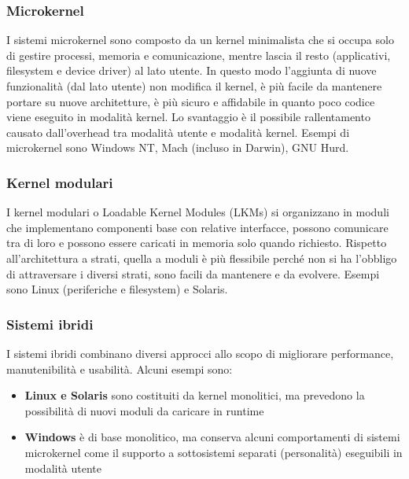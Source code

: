 \documentclass[a4paper]{article}
\begin{document}
\subsubsection*{Microkernel}
I sistemi microkernel sono composto da un kernel minimalista che si occupa solo di gestire processi, memoria e comunicazione,
mentre lascia il resto (applicativi, filesystem e device driver) al lato utente. In questo modo l'aggiunta di nuove funzionalità
(dal lato utente) non modifica il kernel, è più facile da mantenere portare su nuove architetture, è più sicuro e affidabile in
quanto poco codice viene eseguito in modalità kernel. Lo svantaggio è il possibile rallentamento causato dall'overhead tra
modalità utente e modalità kernel. Esempi di microkernel sono Windows NT, Mach (incluso in Darwin), GNU Hurd.

\subsubsection*{Kernel modulari}
I kernel modulari o Loadable Kernel Modules (LKMs) si organizzano in moduli che implementano componenti base con relative
interfacce, possono comunicare tra di loro e possono essere caricati in memoria solo quando richiesto. Rispetto all'architettura
a strati, quella a moduli è più flessibile perché non si ha l'obbligo di attraversare i diversi strati, sono facili da mantenere
e da evolvere. Esempi sono Linux (periferiche e filesystem) e Solaris.

\subsubsection*{Sistemi ibridi}
I sistemi ibridi combinano diversi approcci allo scopo di migliorare performance, manutenibilità e usabilità. Alcuni esempi sono:
\begin{itemize}
	\item \textbf{Linux e Solaris} sono costituiti da kernel monolitici, ma prevedono la possibilità di nuovi moduli da caricare
	in runtime
	\item \textbf{Windows} è di base monolitico, ma conserva alcuni comportamenti di sistemi microkernel come il supporto a
	sottosistemi separati (personalità) eseguibili in modalità utente
\end{itemize}
\end{document}
